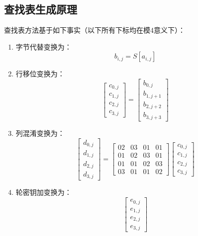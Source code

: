 \documentclass[11pt]{ctexart}
\begin{document}
\subsection{查找表生成原理} %
查找表方法基于如下事实（以下所有下标均在模4意义下）：
\begin{enumerate}[(1)]
    \item 字节代替变换为：$$b_{i, j} = S[a_{i, j}]$$
    \item 行移位变换为：
    \begin{equation*}
    \begin{bmatrix}
    c_{0, j} \\ c_{1, j} \\ c_{2, j} \\ c_{3, j}
    \end{bmatrix}
    =
    \begin{bmatrix}
    b_{0, j} \\ b_{1, j+1} \\ b_{2, j+2} \\ b_{3, j+3}
    \end{bmatrix}
    \end{equation*}
    \item 列混淆变换为：
    \begin{equation*}
    \begin{bmatrix}
    d_{0, j} \\ d_{1, j} \\ d_{2, j} \\ d_{3, j}
    \end{bmatrix}
    =
    \begin{bmatrix}
        02 & 03 & 01 & 01 \\
        01 & 02 & 03 & 01 \\
        01 & 01 & 02 & 03 \\
        03 & 01 & 01 & 02
    \end{bmatrix}
    \begin{bmatrix}
    c_{0, j} \\ c_{1, j} \\ c_{2, j} \\ c_{3, j}
    \end{bmatrix}
    \end{equation*}
    \item 轮密钥加变换为：
    \begin{equation*}
    \begin{bmatrix}
    e_{0, j} \\ e_{1, j} \\ e_{2, j} \\ e_{3, j}

\end{bmatrix}
\end{equation*}
\end{enumerate}
\end{document}
